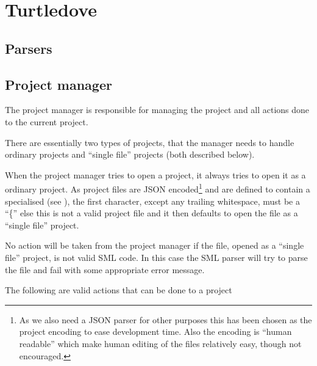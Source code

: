 

\section{Turtledove}
\label{sec:design-turtledove}


\subsection{Parsers}
\label{sec:design-parsers}


\subsection{Project manager}
\label{sec:design-project-manager}

The project manager is responsible for managing the project and all actions done
to the current project. 

There are essentially two types of projects, that the manager needs to handle
ordinary projects and ``single file'' projects (both described below). 

When the project manager tries to open a project, it always tries to open it as
a ordinary project. As project files are JSON encoded\footnote{As we also need a
  JSON parser for other purposes this has been chosen as the project encoding to
  ease development time. Also the encoding is ``human readable'' which make
  human editing of the files relatively easy, though not encouraged.} and are
defined to contain a specialised  (see
), the first character, except any trailing whitespace,
must be a ``\{'' else this is not a valid project file and it then defaults to
open the file as a ``single file'' project.

No action will be taken from the project manager if the file, opened as a
``single file'' project, is not valid SML code. In this case the SML parser will
try to parse the file and fail with some appropriate error message.

The following are valid actions that can be done to a project

